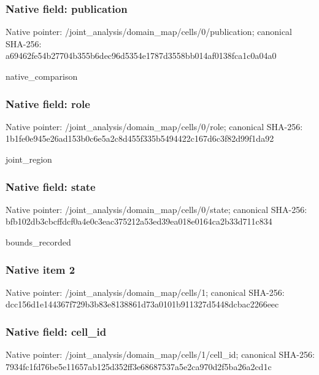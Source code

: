 \documentclass[10pt,a4paper]{article}
\begin{document}
\subsubsection{Native field: publication}
Native pointer: /joint\_\allowbreak{}analysis/domain\_\allowbreak{}map/cells/0/publication; canonical SHA-256: a69462fe54b27704b355b6dec96d5354e1787d3558bb014af0138fca1c0a04a0

\begingroup\raggedright\sloppy native\_\allowbreak{}comparison\par\endgroup

\subsubsection{Native field: role}
Native pointer: /joint\_\allowbreak{}analysis/domain\_\allowbreak{}map/cells/0/role; canonical SHA-256: 1b1fe0e945e26ad153b0c6e5a2c8d455f335b5494422c167d6c3f82d99f1da92

\begingroup\raggedright\sloppy joint\_\allowbreak{}region\par\endgroup

\subsubsection{Native field: state}
Native pointer: /joint\_\allowbreak{}analysis/domain\_\allowbreak{}map/cells/0/state; canonical SHA-256: bfb102db3cbcffdcf0a4e0c3eac375212a53ed39ea018e0164ca2b33d711c834

\begingroup\raggedright\sloppy bounds\_\allowbreak{}recorded\par\endgroup

\subsubsection{Native item 2}
Native pointer: /joint\_\allowbreak{}analysis/domain\_\allowbreak{}map/cells/1; canonical SHA-256: dcc156d1e144367f729b3b83e8138861d73a0101b911327d5448dcbac2266eec

\subsubsection{Native field: cell\_\allowbreak{}id}
Native pointer: /joint\_\allowbreak{}analysis/domain\_\allowbreak{}map/cells/1/cell\_\allowbreak{}id; canonical SHA-256: 7934fc1fd76be5e11657ab125d352ff3e68687537a5e2ca970d2f5ba26a2cd1c
\end{document}
